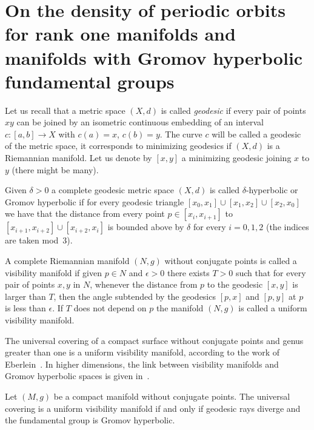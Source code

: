 \documentclass[AHL,Unicode,longabstracts,published]{cedram}
\begin{document}
\section{On the density of periodic orbits for rank one manifolds and manifolds with Gromov hyperbolic fundamental groups}\label{SECgromov}

Let us recall that a metric space $(X,d)$ is called \emph{geodesic} if every pair of points $xy$ can be joined by an isometric continuous embedding of an interval $c: [a,b] \longrightarrow X$ with $c(a)=x$, $c(b)=y$. The curve $c$ will be called a geodesic of the metric space, it corresponds to minimizing geodesics if $(X,d)$ is a Riemannian manifold. Let us denote by $[x,y]$ a minimizing geodesic joining $x$ to $y$ (there might be many).

\begin{defi}\label{Gromov-hyperbolic}
Given $\delta >0$ a complete geodesic metric space $(X,d)$ is called $\delta$-hyperbolic or Gromov hyperbolic if for every geodesic triangle $[x_{0},x_{1}] \cup [x_{1},x_{2}] \cup [x_{2},x_{0}]$ we have that the distance from every point $p \in [x_{i},x_{i+1}]$ to $[x_{i+1},x_{i+2}]\cup [x_{i+2},x_{i}]$ is bounded above by $\delta$ for every $i = 0,1,2$ (the indices are taken mod~3).
\end{defi}

\begin{defi}\label{visibility}
A complete Riemannian manifold $(N,g)$ without conjugate points is called a visibility manifold if given $p \in N$ and $\epsilon >0$ there exists $T>0$ such that for every pair of points $x, y $ in $N$, whenever the distance from $p$ to the geodesic $[x,y]$ is larger than $T$, then the angle subtended by the geodesics $[p,x]$ and $[p,y]$ at $p$ is less than $\epsilon$. If $T$ does not depend on $p$ the manifold $(N,g)$ is called a uniform visibility manifold.
\end{defi}

The universal covering of a compact surface without conjugate points and genus greater than one is a uniform visibility manifold, according to the work of Eberlein~\cite{kn:Eberlein}. In higher dimensions, the link between visibility manifolds and Gromov hyperbolic spaces is given in~\cite{kn:Ruggiero-Ensaios,kn:Ruggiero-SBM}.

\begin{theo}\label{visibility-gromov}
Let $(M,g)$ be a compact manifold without conjugate points. The universal covering is a uniform visibility manifold if and only if geodesic rays diverge and the fundamental group is Gromov hyperbolic.
\end{theo}
\end{document}
